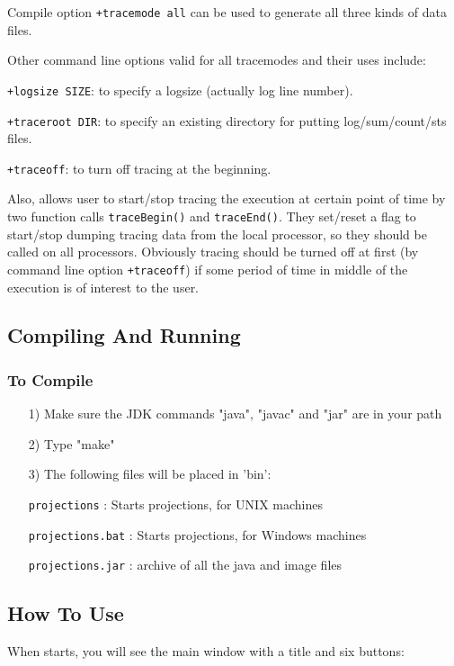 Compile option {\tt +tracemode all} can be used to generate all three kinds
of data files.

Other command line options valid for all tracemodes and their uses include:

{\tt +logsize SIZE}: to specify a logsize (actually log line number).

{\tt +traceroot DIR}: to specify an existing directory for putting log/sum/count/sts
files.

{\tt +traceoff}: to turn off tracing at the beginning.
\vskip 2pt

Also, \charmpp{} allows user to start/stop tracing the execution at certain
point of time by two \charmpp{} function calls {\tt traceBegin()} and {\tt traceEnd()}.
They set/reset a flag to start/stop dumping tracing data from the local processor,
so they should be called on all processors. Obviously tracing should be turned
off at first (by command line option {\tt +traceoff}) if some period of time in
middle of the execution is of interest to the user.

\subsection{Compiling And Running \projections{}}

\subsubsection{To Compile \projections{}}
\begin{enumerate}
\item[1)]
   Make sure the JDK commands "java", "javac" and "jar"
   are in your path
\item[2)]
   Type "make"
\item[3)]
   The following files will be placed in 'bin':

      {\tt projections}           : Starts projections, for UNIX machines

      {\tt projections.bat}       : Starts projections, for Windows machines

      {\tt projections.jar}       : archive of all the java and image files
\end{enumerate}

\subsection{How To Use \projections{}}
When \projections{} starts, you will see the main window with a title and
six buttons:

